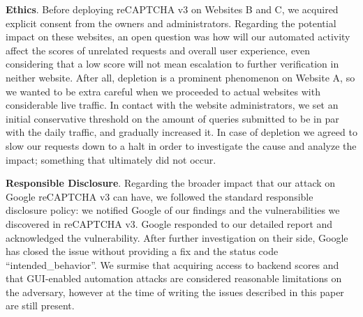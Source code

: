 \textbf{Ethics}.
Before deploying reCAPTCHA v3 on Websites B and C, we acquired explicit consent from the owners and administrators.
Regarding the potential impact on these websites, an open question was how will our automated activity affect the scores of unrelated requests and overall user experience, even considering that a low score will not mean escalation to further verification in neither website.
After all, depletion is a prominent phenomenon on Website A, so we wanted to be extra careful when we proceeded to actual websites with considerable live traffic.
In contact with the website administrators, we set an initial conservative threshold on the amount of queries submitted to be in par with the daily traffic, and gradually increased it.
In case of depletion we agreed to slow our requests down to a halt in order to investigate the cause and analyze the impact; something that ultimately did not occur.


\textbf{Responsible Disclosure}.
Regarding the broader impact that our attack on Google reCAPTCHA v3 can have, we followed the standard responsible disclosure policy: we notified Google of our findings and the vulnerabilities we discovered in reCAPTCHA v3.
Google responded to our detailed report and acknowledged the vulnerability.
After further investigation on their side, Google has closed the issue without providing a fix and the status code ``intended\_behavior''.
We surmise that acquiring access to backend scores and that GUI-enabled automation attacks are considered reasonable limitations on the adversary, however at the time of writing the issues described in this paper are still present.

